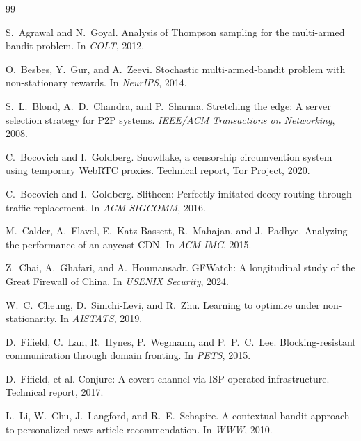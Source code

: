\documentclass[11pt,a4paper]{article}
\begin{document}
\begin{thebibliography}{99}

S.~Agrawal and N.~Goyal.
Analysis of Thompson sampling for the multi-armed bandit problem.
In \textit{COLT}, 2012.

O.~Besbes, Y.~Gur, and A.~Zeevi.
Stochastic multi-armed-bandit problem with non-stationary rewards.
In \textit{NeurIPS}, 2014.

S.~L.~Blond, A.~D.~Chandra, and P.~Sharma.
Stretching the edge: A server selection strategy for P2P systems.
\textit{IEEE/ACM Transactions on Networking}, 2008.

C.~Bocovich and I.~Goldberg.
Snowflake, a censorship circumvention system using temporary WebRTC
proxies. Technical report, Tor Project, 2020.

C.~Bocovich and I.~Goldberg.
Slitheen: Perfectly imitated decoy routing through traffic
replacement. In \textit{ACM SIGCOMM}, 2016.

M.~Calder, A.~Flavel, E.~Katz-Bassett, R.~Mahajan, and J.~Padhye.
Analyzing the performance of an anycast CDN.
In \textit{ACM IMC}, 2015.

Z.~Chai, A.~Ghafari, and A.~Houmansadr.
GFWatch: A longitudinal study of the Great Firewall of China.
In \textit{USENIX Security}, 2024.

W.~C.~Cheung, D.~Simchi-Levi, and R.~Zhu.
Learning to optimize under non-stationarity.
In \textit{AISTATS}, 2019.

D.~Fifield, C.~Lan, R.~Hynes, P.~Wegmann, and P.~P.~C.~Lee.
Blocking-resistant communication through domain fronting.
In \textit{PETS}, 2015.

D.~Fifield, et al.
Conjure: A covert channel via ISP-operated infrastructure.
Technical report, 2017.

L.~Li, W.~Chu, J.~Langford, and R.~E.~Schapire.
A contextual-bandit approach to personalized news article
recommendation. In \textit{WWW}, 2010.


\end{thebibliography}
\end{document}
